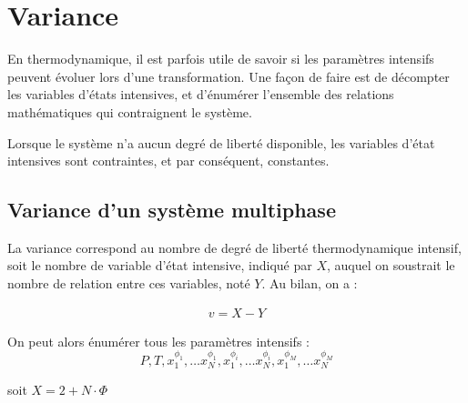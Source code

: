 \documentclass[a4paper,16pt]{book}
\begin{document}

\section{Variance}

En thermodynamique, il est parfois utile de savoir si les paramètres intensifs peuvent évoluer lors d'une transformation. Une façon de faire est de décompter les variables d'états intensives, et d'énumérer l’ensemble des relations mathématiques qui contraignent le système.

Lorsque le système n'a aucun degré de liberté disponible, les variables d'état intensives sont contraintes, et par conséquent, constantes.

\subsection{Variance d'un système multiphase}

La variance correspond au nombre de degré de liberté thermodynamique intensif, soit le nombre de variable d'état intensive, indiqué par $X$, auquel on soustrait le nombre de relation entre ces variables, noté $Y$. Au bilan, on a : 

\begin{align}
v = X - Y
\end{align}

On peut alors énumérer tous les paramètres intensifs :
\begin{equation}
P, T, x^{\phi_1}_1, \ldots x^{\phi_1}_N, x^{\phi_i}_1, \ldots x^{\phi_i}_N, x^{\phi_M}_1, \ldots x^{\phi_M}_N
\end{equation}

soit $X = 2 + N \cdot \Phi $
\end{document}
